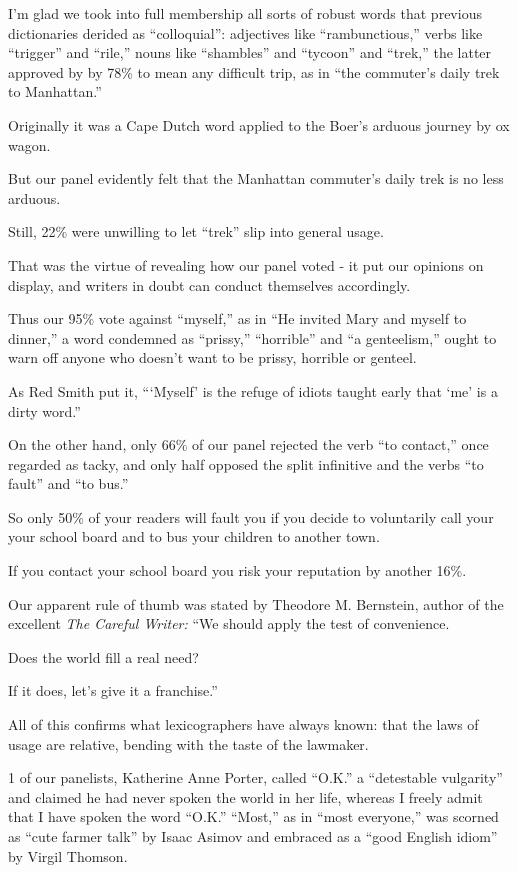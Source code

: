 \documentclass{book}
\numberwithin{equation}{section}
\begin{document}
%
I'm glad we took into full membership all sorts of robust words that previous dictionaries derided as ``colloquial'': adjectives like ``rambunctious,'' verbs like ``trigger'' and ``rile,'' nouns like ``shambles'' and ``tycoon'' and ``trek,'' the latter approved by by 78\% to mean any difficult trip, as in ``the commuter's daily trek to Manhattan.''

Originally it was a Cape Dutch word applied to the Boer's arduous journey by ox wagon.

But our panel evidently felt that the Manhattan commuter's daily trek is no less arduous.

%
Still, 22\% were unwilling to let ``trek'' slip into general usage.

That was the virtue of revealing how our panel voted - it put our opinions on display, and writers in doubt can conduct themselves accordingly.

Thus our 95\% vote against ``myself,'' as in ``He invited Mary and myself to dinner,'' a word condemned as ``prissy,'' ``horrible'' and ``a genteelism,'' ought to warn off anyone who doesn't want to be prissy, horrible or genteel.

As Red Smith put it, ```Myself' is the refuge of idiots taught early that `me' is a dirty word.''

%
On the other hand, only 66\% of our panel rejected the verb ``to contact,'' once regarded as tacky, and only half opposed the split infinitive and the verbs ``to fault'' and ``to bus.''

So only 50\% of your readers will fault you if you decide to voluntarily call your your school board and to bus your children to another town.

If you contact your school board you risk your reputation by another 16\%.

Our apparent rule of thumb was stated by Theodore M. Bernstein, author of the excellent \textit{The Careful Writer:} ``We should apply the test of convenience.

Does the world fill a real need?

If it does, let's give it a franchise.''

%
All of this confirms what lexicographers have always known: that the laws of usage are relative, bending with the taste of the lawmaker.

1 of our panelists, Katherine Anne Porter, called ``O.K.'' a ``detestable vulgarity'' and claimed he had never spoken the world in her life, whereas I freely admit that I have spoken the word ``O.K.'' ``Most,'' as in ``most everyone,'' was scorned as ``cute farmer talk'' by Isaac Asimov and embraced as a ``good English idiom'' by Virgil Thomson.
\end{document}
